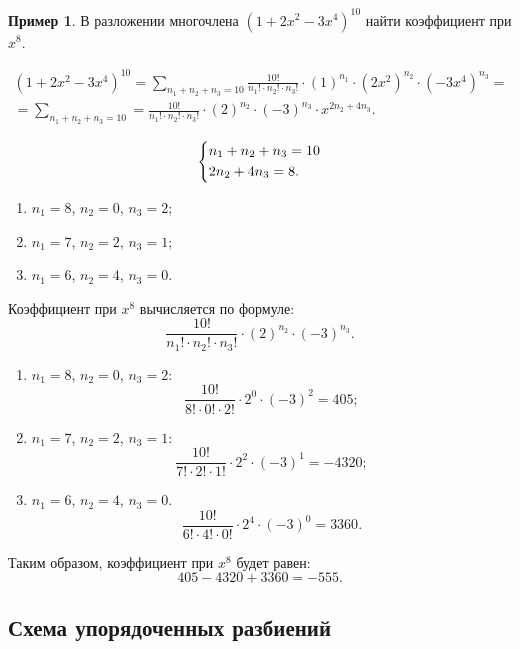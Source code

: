 \documentclass[a5paper, 11pt]{extarticle}
\theoremstyle{definition}
\newtheorem{example}{Пример}[subsection]
\theoremstyle{definition}
\theoremstyle{definition}
\numberwithin{figure}{section}
\numberwithin{table}{section}
\begin{document}
\begin{example}
    В разложении многочлена \((1 + 2x^2 - 3x^4)^{10}\) найти коэффициент при \(x^8\).

    \begin{gather*}
        (1 + 2x^2 - 3x^4)^{10} =
        \sum_{n_1 + n_2 + n_3 = 10} \frac{10!}{n_1! \cdot n_2! \cdot n_3!} \cdot (1)^{n_1} \cdot (2x^2)^{n_2} \cdot (-3x^4)^{n_3} = \\ =
        \sum_{n_1 + n_2 + n_3 = 10} = \frac{10!}{n_1! \cdot n_2! \cdot n_3!} \cdot (2)^{n_2} \cdot (-3)^{n_3} \cdot x^{2n_2 + 4n_3}.
    \end{gather*}

    \[
        \begin{dcases}
            n_1 + n_2 + n_3 = 10 \\
            2n_2 + 4n_3 = 8.
        \end{dcases}
    \]

    \begin{enumerate}
        \item \(n_1 = 8\), \(n_2 = 0\), \(n_3 = 2\);
        \item \(n_1 = 7\), \(n_2 = 2\), \(n_3 = 1\);
        \item \(n_1 = 6\), \(n_2 = 4\), \(n_3 = 0\).
    \end{enumerate}

    Коэффициент при \(x^8\) вычисляется по формуле:
    \[
        \frac{10!}{n_1! \cdot n_2! \cdot n_3!} \cdot (2)^{n_2} \cdot (-3)^{n_3}.
    \]

    \begin{enumerate}
        \item \(n_1 = 8\), \(n_2 = 0\), \(n_3 = 2\):
              \[
                  \frac{10!}{8! \cdot 0! \cdot 2!} \cdot 2^0 \cdot (-3)^2 = 405;
              \]
        \item \(n_1 = 7\), \(n_2 = 2\), \(n_3 = 1\):
              \[
                  \frac{10!}{7! \cdot 2! \cdot 1!} \cdot 2^2 \cdot (-3)^1 = -4320;
              \]
        \item \(n_1 = 6\), \(n_2 = 4\), \(n_3 = 0\).
              \[
                  \frac{10!}{6! \cdot 4! \cdot 0!} \cdot 2^4 \cdot (-3)^0 = 3360.
              \]
    \end{enumerate}

    Таким образом, коэффициент при \(x^8\) будет равен:
    \[
        405 - 4320 + 3360 = -555.
    \]
\end{example}

\subsection{Схема упорядоченных разбиений}
\end{document}
